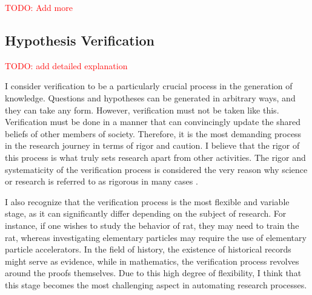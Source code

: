 \documentclass{book}
\begin{document}
\textcolor{red}{TODO: Add more}






\subsection{Hypothesis Verification}

\textcolor{red}{TODO: add detailed explanation}

I consider verification to be a particularly crucial process in the generation of knowledge. Questions and hypotheses can be generated in arbitrary ways, and they can take any form. However, verification must not be taken like this. Verification must be done in a manner that can convincingly update the shared beliefs of other members of society. Therefore, it is the most demanding process in the research journey in terms of rigor and caution. I believe that the rigor of this process is what truly sets research apart from other activities. The rigor and systematicity of the verification process is considered the very reason why science or research is referred to as rigorous in many cases \cite{sep-scientific-method,hoyningen2008systematicity,haack2003defending}.

I also recognize that the verification process is the most flexible and variable stage, as it can significantly differ depending on the subject of research. For instance, if one wishes to study the behavior of rat, they may need to train the rat, whereas investigating elementary particles may require the use of elementary particle accelerators. In the field of history, the existence of historical records might serve as evidence, while in mathematics, the verification process revolves around the proofs themselves. Due to this high degree of flexibility, I think that this stage becomes the most challenging aspect in automating research processes.
\end{document}
